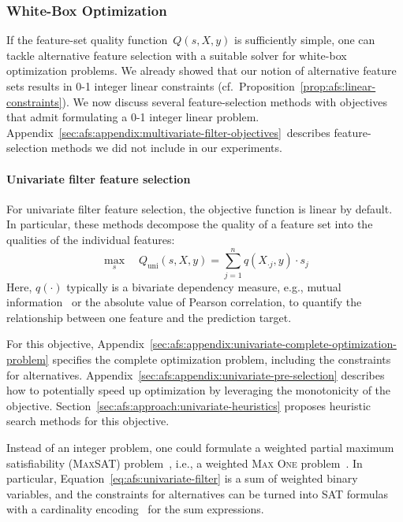 \documentclass{article}
\theoremstyle{definition}
\begin{document}
\subsubsection{White-Box Optimization}
\label{sec:afs:approach:objectives:white-box}

If the feature-set quality function~$Q(s,X,y)$ is sufficiently simple, one can tackle alternative feature selection with a suitable solver for white-box optimization problems.
We already showed that our notion of alternative feature sets results in 0-1 integer linear constraints (cf.~Proposition~\ref{prop:afs:linear-constraints}).
We now discuss several feature-selection methods with objectives that admit formulating a 0-1 integer linear problem.
Appendix~\ref{sec:afs:appendix:multivariate-filter-objectives}~describes feature-selection methods we did not include in our experiments.

\paragraph{Univariate filter feature selection}

For univariate filter feature selection, the objective function is linear by default.
In particular, these methods decompose the quality of a feature set into the qualities of the individual features:
%
\begin{equation}
	\max_s \quad Q_{\text{uni}}(s,X,y) = \sum_{j=1}^{n} q(X_{\cdot{}j},y) \cdot s_j
	\label{eq:afs:univariate-filter}
\end{equation}
%
Here, $q(\cdot)$ typically is a bivariate dependency measure, e.g., mutual information~\cite{kraskov2004estimating} or the absolute value of Pearson correlation, to quantify the relationship between one feature and the prediction target.

For this objective, Appendix~\ref{sec:afs:appendix:univariate-complete-optimization-problem} specifies the complete optimization problem, including the constraints for alternatives.
Appendix~\ref{sec:afs:appendix:univariate-pre-selection} describes how to potentially speed up optimization by leveraging the monotonicity of the objective.
Section~\ref{sec:afs:approach:univariate-heuristics} proposes heuristic search methods for this objective.

Instead of an integer problem, one could formulate a weighted partial maximum satisfiability (\textsc{MaxSAT}) problem~\cite{bacchus2021maximum, li2021maxsat}, i.e., a weighted \textsc{Max One} problem~\cite{khanna1997complete}.
In particular, Equation~\ref{eq:afs:univariate-filter} is a sum of weighted binary variables, and the constraints for alternatives can be turned into SAT formulas with a cardinality encoding~\cite{sinz2005towards} for the sum expressions.
\end{document}
